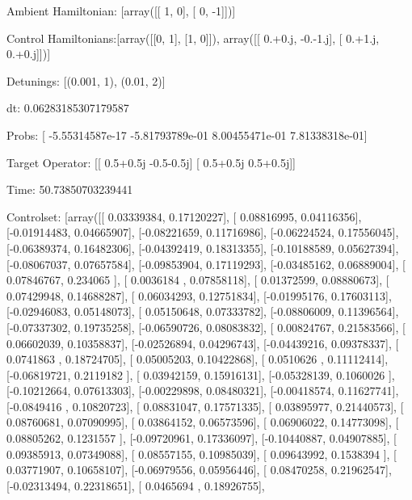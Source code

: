 \documentclass{article}
\begin{document}
    

\newpage

Ambient Hamiltonian: [array([[ 1,  0],
       [ 0, -1]])]

Control Hamiltonians:[array([[0, 1],
       [1, 0]]), array([[ 0.+0.j, -0.-1.j],
       [ 0.+1.j,  0.+0.j]])]

Detunings: [(0.001, 1), (0.01, 2)]

 dt: 0.06283185307179587

Probs: [ -5.55314587e-17  -5.81793789e-01   8.00455471e-01   7.81338318e-01]

Target Operator: [[ 0.5+0.5j -0.5-0.5j]
 [ 0.5+0.5j  0.5+0.5j]]

Time: 50.73850703239441

Controlset: [array([[ 0.03339384,  0.17120227],
       [ 0.08816995,  0.04116356],
       [-0.01914483,  0.04665907],
       [-0.08221659,  0.11716986],
       [-0.06224524,  0.17556045],
       [-0.06389374,  0.16482306],
       [-0.04392419,  0.18313355],
       [-0.10188589,  0.05627394],
       [-0.08067037,  0.07657584],
       [-0.09853904,  0.17119293],
       [-0.03485162,  0.06889004],
       [ 0.07846767,  0.234065  ],
       [ 0.0036184 ,  0.07858118],
       [ 0.01372599,  0.08880673],
       [ 0.07429948,  0.14688287],
       [ 0.06034293,  0.12751834],
       [-0.01995176,  0.17603113],
       [-0.02946083,  0.05148073],
       [ 0.05150648,  0.07333782],
       [-0.08806009,  0.11396564],
       [-0.07337302,  0.19735258],
       [-0.06590726,  0.08083832],
       [ 0.00824767,  0.21583566],
       [ 0.06602039,  0.10358837],
       [-0.02526894,  0.04296743],
       [-0.04439216,  0.09378337],
       [ 0.0741863 ,  0.18724705],
       [ 0.05005203,  0.10422868],
       [ 0.0510626 ,  0.11112414],
       [-0.06819721,  0.2119182 ],
       [ 0.03942159,  0.15916131],
       [-0.05328139,  0.1060026 ],
       [-0.10212664,  0.07613303],
       [-0.00229898,  0.08480321],
       [-0.00418574,  0.11627741],
       [-0.0849416 ,  0.10820723],
       [ 0.08831047,  0.17571335],
       [ 0.03895977,  0.21440573],
       [ 0.08760681,  0.07090995],
       [ 0.03864152,  0.06573596],
       [ 0.06906022,  0.14773098],
       [ 0.08805262,  0.1231557 ],
       [-0.09720961,  0.17336097],
       [-0.10440887,  0.04907885],
       [ 0.09385913,  0.07349088],
       [ 0.08557155,  0.10985039],
       [ 0.09643992,  0.1538394 ],
       [ 0.03771907,  0.10658107],
       [-0.06979556,  0.05956446],
       [ 0.08470258,  0.21962547],
       [-0.02313494,  0.22318651],
       [ 0.0465694 ,  0.18926755],
\end{document}
